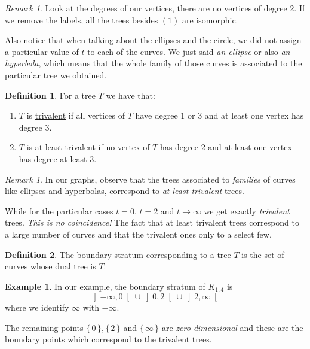 \documentclass[11pt]{article}
\newcommand{\set}[1]{\{\,#1\,\}}    %
\newcommand{\obonj}[1]{\left\rbrack#1\right\lbrack}
\theoremstyle{definition}
\newtheorem{Def}{Definition}           %
\newtheorem{Ex}{Example}               %
\theoremstyle{remark}
\newtheorem{Rmk}[Th]{Remark}      %
\numberwithin{theorem}{section}
\begin{document}
\begin{Rmk}
Look at the degrees of our vertices, there are no vertices of degree 2. If we remove the labels, all the trees besides $(1)$ are isomorphic.\par
Also notice that when talking about the ellipses and the circle, we did not assign a particular value of $t$ to each of the curves. We just said \emph{an ellipse} or also \emph{an hyperbola}, which means that the whole family of those curves is associated to the particular tree we obtained.
\end{Rmk}

\begin{Def}
For a tree $T$ we have that:
\begin{enumerate}
    \itemsep=-0.4em
    \item $T$ is \underline{trivalent} if all vertices of $T$ have degree $1$ or $3$ and at least one vertex has degree $3$.
    \item $T$ is \underline{at least trivalent} if no vertex of $T$ has degree $2$ and at least one vertex has degree at least $3$.
\end{enumerate}
\end{Def}

\begin{Rmk}
In our graphs, observe that the trees associated to \emph{families} of curves like ellipses and hyperbolas, correspond to \emph{at least trivalent} trees.\par 
While for the particular cases $t=0$, $t=2$ and $t\to\infty$ we get exactly \emph{trivalent} trees. \emph{This is no coincidence!} The fact that at least trivalent trees correspond to a large number of curves and that the trivalent ones only to a select few.
\end{Rmk}

\begin{Def}
    The \underline{boundary stratum} corresponding to a tree $T$ is the set of curves whose dual tree is $T$. 
\end{Def}

\begin{Ex}
In our example, the boundary stratum of $K_{1,4}$ is $$\obonj{-\infty,0}\cup\obonj{0,2}\cup\obonj{2,\infty}$$
where we identify $\infty$ with $-\infty$.\par 
The remaining points $\set{0},\set{2}$ and $\set{\infty}$ are \emph{zero-dimensional} and these are the boundary points which correspond to the trivalent trees.
\end{Ex} 
\end{document}
